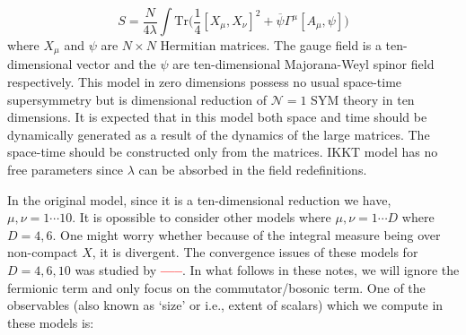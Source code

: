 \documentclass[11pt]{article}
\newcommand{\TODO}[1]{\textcolor{red}{{\bf #1}}}
\begin{document}
\begin{equation}
	\label{eq:IKKT} 
S = \frac{N}{4\lambda} \int \mbox{Tr} \Big( \frac{1}{4} [X_\mu, X_\nu]^{2} + \overline{\psi} \Gamma^{\mu} [A_{\mu},\psi] \Big) 
\end{equation}
where $X_{\mu}$ and $\psi$ are $N \times N$ Hermitian matrices. The gauge field is a ten-dimensional vector and the $\psi$ are ten-dimensional Majorana-Weyl spinor field respectively. This model in zero dimensions possess no usual space-time supersymmetry 
but is dimensional reduction of $\mathcal{N}=1$ SYM theory in ten dimensions. 
It is expected that in this model both space and time should be dynamically generated as a result of the dynamics of the large matrices. The space-time should be constructed only from the matrices. IKKT model has no free parameters since $\lambda$ can be absorbed in the field redefinitions. 

In the original model, since it is a ten-dimensional reduction we have, $\mu, \nu = 1 \cdots 10$. It is opossible to consider other models where $\mu, \nu = 1 \cdots D$ where $D=4,6$. One might worry whether because of the integral measure being over non-compact $X$, it is divergent. The convergence issues of these models for $D=4,6,10$ was studied by \TODO{-----}. In what follows in these notes, we will ignore the fermionic term and only focus on the commutator/bosonic term. One of the observables (also known as `size' or i.e., extent of scalars) which we compute in these models is:
\end{document}
